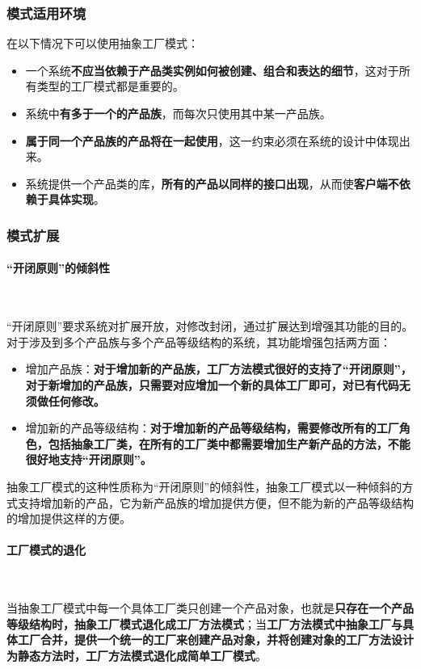 \subsubsection{模式适用环境}
在以下情况下可以使用抽象工厂模式：
\begin{itemize}
    \item 一个系统\textbf{不应当依赖于产品类实例如何被创建、组合和表达的细节}，这对于所有类型的工厂模式都是重要的。
    \item 系统中\textbf{有多于一个的产品族}，而每次只使用其中某一产品族。
    \item \textbf{属于同一个产品族的产品将在一起使用}，这一约束必须在系统的设计中体现出来。
    \item 系统提供一个产品类的库，\textbf{所有的产品以同样的接口出现}，从而使\textbf{客户端不依赖于具体实现}。
\end{itemize}

\subsubsection{模式扩展}
\paragraph*{“开闭原则”的倾斜性}~{} \par
“开闭原则”要求系统对扩展开放，对修改封闭，通过扩展达到增强其功能的目的。对于涉及到多个产品族与多个产品等级结构的系统，其功能增强包括两方面：
\begin{itemize}
    \item 增加产品族：\textbf{对于增加新的产品族，工厂方法模式很好的支持了“开闭原则”，对于新增加的产品族，只需要对应增加一个新的具体工厂即可，对已有代码无须做任何修改。}
    \item 增加新的产品等级结构：\textbf{对于增加新的产品等级结构，需要修改所有的工厂角色，包括抽象工厂类，在所有的工厂类中都需要增加生产新产品的方法，不能很好地支持“开闭原则”。}
\end{itemize}
抽象工厂模式的这种性质称为“开闭原则”的倾斜性，抽象工厂模式以一种倾斜的方式支持增加新的产品，它为新产品族的增加提供方便，但不能为新的产品等级结构的增加提供这样的方便。

\paragraph*{工厂模式的退化}~{} \par
当抽象工厂模式中每一个具体工厂类只创建一个产品对象，也就是\textbf{只存在一个产品等级结构时，抽象工厂模式退化成工厂方法模式}；当\textbf{工厂方法模式中抽象工厂与具体工厂合并，提供一个统一的工厂来创建产品对象，并将创建对象的工厂方法设计为静态方法时，工厂方法模式退化成简单工厂模式}。
